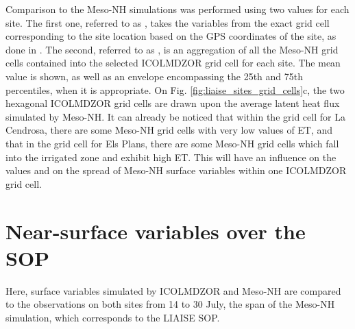 Comparison to the Meso-NH simulations was performed using two values for each site. 
The first one, referred to as \mesoexact, takes the variables from the exact grid cell corresponding to the site location based on the GPS coordinates of the site, as done in \citet{lunel_irrigation_2024}. 
The second, referred to as \mesomean, is an aggregation of all the Meso-NH grid cells contained into the selected ICOLMDZOR grid cell for each site. The mean value is shown, as well as an envelope encompassing the 25th and 75th percentiles, when it is appropriate.
On Fig. \ref{fig:liaise_sites_grid_cells}c, the two hexagonal ICOLMDZOR grid cells are drawn upon the average latent heat flux simulated by Meso-NH. It can already be noticed that within the grid cell for La Cendrosa, there are some Meso-NH grid cells with very low values of ET, and that in the grid cell for Els Plans, there are some Meso-NH grid cells which fall into the irrigated zone and exhibit high ET. This will have an influence on the \mesomean values and on the spread of Meso-NH surface variables within one ICOLMDZOR grid cell. 

\section{Near-surface variables over the SOP}
\label{sec:sop}

Here, surface variables simulated by ICOLMDZOR and Meso-NH are compared to the observations on both sites from 14 to 30 July, the span of the Meso-NH simulation, which corresponds to the LIAISE SOP.

\hfill

